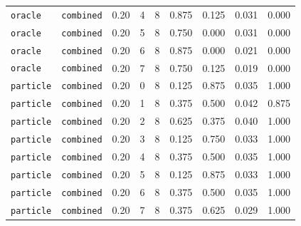 \documentclass{article}
\begin{document}
\begin{center}
\begin{tabular}{llccccccc}
\texttt{oracle} & \texttt{combined} & 0.20 & 4 & 8 & 0.875 & 0.125 & 0.031 & 0.000 \\
\texttt{oracle} & \texttt{combined} & 0.20 & 5 & 8 & 0.750 & 0.000 & 0.031 & 0.000 \\
\texttt{oracle} & \texttt{combined} & 0.20 & 6 & 8 & 0.875 & 0.000 & 0.021 & 0.000 \\
\texttt{oracle} & \texttt{combined} & 0.20 & 7 & 8 & 0.750 & 0.125 & 0.019 & 0.000 \\
\texttt{particle} & \texttt{combined} & 0.20 & 0 & 8 & 0.125 & 0.875 & 0.035 & 1.000 \\
\texttt{particle} & \texttt{combined} & 0.20 & 1 & 8 & 0.375 & 0.500 & 0.042 & 0.875 \\
\texttt{particle} & \texttt{combined} & 0.20 & 2 & 8 & 0.625 & 0.375 & 0.040 & 1.000 \\
\texttt{particle} & \texttt{combined} & 0.20 & 3 & 8 & 0.125 & 0.750 & 0.033 & 1.000 \\
\texttt{particle} & \texttt{combined} & 0.20 & 4 & 8 & 0.375 & 0.500 & 0.035 & 1.000 \\
\texttt{particle} & \texttt{combined} & 0.20 & 5 & 8 & 0.125 & 0.875 & 0.033 & 1.000 \\
\texttt{particle} & \texttt{combined} & 0.20 & 6 & 8 & 0.375 & 0.500 & 0.035 & 1.000 \\
\texttt{particle} & \texttt{combined} & 0.20 & 7 & 8 & 0.375 & 0.625 & 0.029 & 1.000 \\
\bottomrule
\end{tabular}
\end{center}
\end{document}
